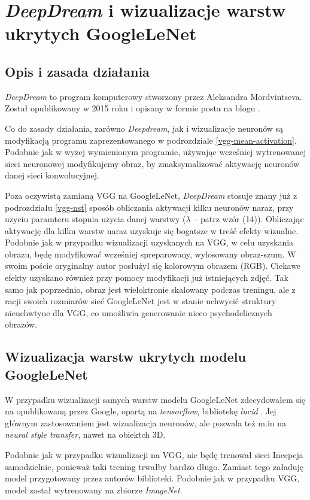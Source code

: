 \section{\textit{DeepDream} i wizualizacje warstw ukrytych GoogleLeNet}

\subsection{Opis i zasada działania}
\label{ddopis}
\textit{DeepDream} to  program komputerowy stworzony przez Aleksandra Mordvintseva. Został opublikowany  w 2015 roku i opisany w formie posta na blogu \cite{deepdream}.

Co do zasady działania, zarówno \textit{Deepdream}, jak i wizualizacje neuronów są modyfikacją programu zaprezentowanego w podrozdziale \ref{vgg-mean-activation}. Podobnie jak w wyżej wymienionym programie, używając wcześniej wytrenowanej sieci neuronowej modyfikujemy obraz, by zmaksymalizować aktywację neuronów danej sieci konwolucyjnej.

Poza oczywistą zamianą VGG na GoogleLeNet, \textit{DeepDream} stosuje znany już z podrozdziału
\ref{vgg-nst} sposób obliczania aktywacji kilku neuronów naraz, przy użyciu paramteru stopnia 
użycia danej warstwy (\(\lambda\) -- patrz wzór (14)). Obliczając aktywację dla kilku warstw naraz uzyskuje się bogatsze w treść efekty wizualne. Podobnie jak w przypadku wizualizacji uzyskanych na VGG, w celu uzyskania obrazu, będę
modyfikować wcześniej spreparowany, wylosowany obraz-szum. W swoim poście oryginalny autor posłużył się kolorowym obrazem (RGB). Ciekawe efekty uzyskano również przy pomocy modyfikacji już istniejących zdjęć. Tak samo jak poprzednio, obraz jest wieloktronie skalowany podczas treningu, ale z racji swoich rozmiarów sieć GoogleLeNet jest w stanie uchwycić struktury nieuchwtyne dla VGG, co umożliwia generowanie 
nieco psychodelicznych obrazów.

\subsection{Wizualizacja warstw ukrytych modelu GoogleLeNet}
W przypadku wizualizacji samych warstw modelu GoogleLeNet zdecydowałem się na  
opublikowaną przez Google, opartą na \textit{tensorflow}, bibliotekę \textit{lucid} \cite{lucidrepo}. Jej głównym zastosowaniem jest wizualizacja neuronów, ale pozwala też m.in na \textit{neural style transfer}, nawet na obiektch 3D.

Podobnie jak w przypadku wizualizacji na VGG, nie będę trenował sieci Incepcja samodzielnie, ponieważ taki trening trwałby bardzo długo. Zamiast tego załaduję model przygotowany przez autorów biblioteki. Podobnie jak w przypadku VGG, model został wytrenowany na zbiorze \textit{ImageNet}.

